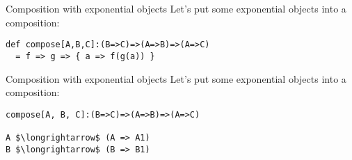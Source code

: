 \documentclass{beamer}
\begin{document}
    \begin{frame}[fragile]{Composition with exponential objects}
        Let's put some exponential objects into a composition: \newline
        \begin{center}
        \end{center}
        \begin{lstlisting}
def compose[A,B,C]:(B=>C)=>(A=>B)=>(A=>C)
  = f => g => { a => f(g(a)) }
        \end{lstlisting}
    \end{frame}

    \begin{frame}[fragile]{Composition with exponential objects}
        Let's put some exponential objects into a composition: \newline
        \begin{lstlisting}
compose[A, B, C]:(B=>C)=>(A=>B)=>(A=>C)

A $\longrightarrow$ (A => A1)
B $\longrightarrow$ (B => B1)
        \end{lstlisting}
    \end{frame}
\end{document}
